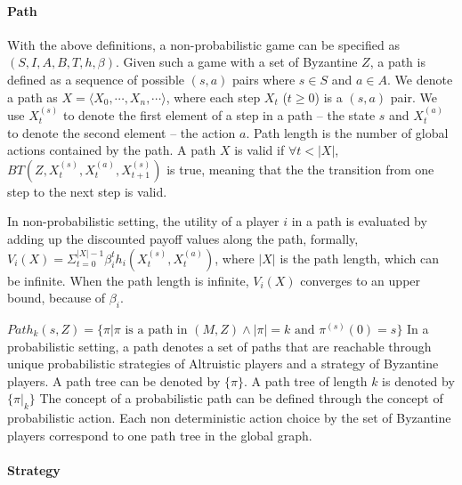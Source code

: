 \paragraph{Path}
With the above definitions, a non-probabilistic game can be specified as $(S,I,A,B,T,h,\beta)$. Given such a game with a set of Byzantine $Z$,
a path is defined as a sequence of possible $(s,a)$ pairs where $s \in S$ and $a \in A$. We denote a path as $X=\langle X_0, \cdots, X_n, \cdots\rangle$, where each step $X_t$ ($t\geq 0$) is a $(s,a)$ pair. We use $X_t^{(s)}$ to denote the first element of a step in a path -- the state $s$ and $X_t^{(a)}$ to denote the second element -- the action $a$. Path length is the number of global actions contained by the path.
A path $X$ is valid if $\forall t < |X| $, $BT(Z,X_t^{(s)},X_t^{(a)},X_{t+1}^{(s)})$ is true, meaning that the the transition from one step to the next step is valid.

In non-probabilistic setting, the utility of a player $i$ in a path is evaluated by adding up the discounted payoff values along the path, formally,
$V_i(X)= \Sigma_{t=0}^{|X|-1}{\beta_i^{t} h_i(X_t^{(s)},X_t^{(a)})}$, where $|X|$ is the path length, which can be infinite. When the path length is infinite, $V_i(X)$ converges to an upper bound, because of $\beta_i$.

$Path_k(s,Z)= \{\pi | \pi \text{ is a path in }(M,Z) \wedge |\pi|=k\text{ and }\pi^{(s)}(0)=s \}$
In a probabilistic setting, a path denotes a set of paths that are reachable through unique probabilistic strategies of Altruistic players and a strategy of Byzantine players. A path tree can be denoted by $\{\pi\}$. A path tree of length $k$ is denoted by $\{\pi|_k\}$
The concept of a probabilistic path can be defined through the concept of probabilistic action. Each non deterministic action choice by the set of Byzantine players correspond to one path tree in the global graph.

\paragraph{Strategy}

